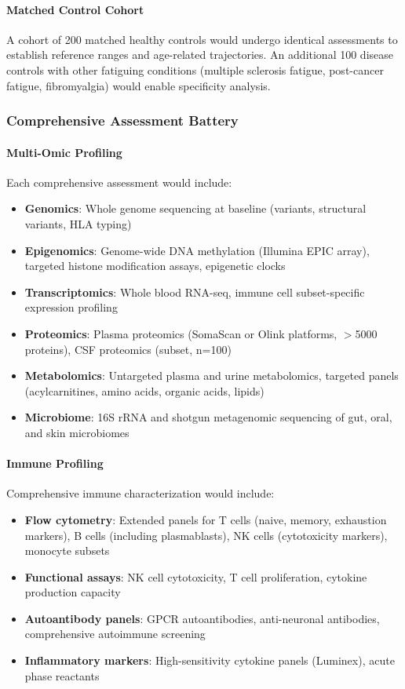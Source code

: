 \paragraph{Matched Control Cohort}
A cohort of 200 matched healthy controls would undergo identical assessments to establish reference ranges and age-related trajectories. An additional 100 disease controls with other fatiguing conditions (multiple sclerosis fatigue, post-cancer fatigue, fibromyalgia) would enable specificity analysis.

\subsubsection{Comprehensive Assessment Battery}

\paragraph{Multi-Omic Profiling}
Each comprehensive assessment would include:
\begin{itemize}
    \item \textbf{Genomics}: Whole genome sequencing at baseline (variants, structural variants, HLA typing)
    \item \textbf{Epigenomics}: Genome-wide DNA methylation (Illumina EPIC array), targeted histone modification assays, epigenetic clocks
    \item \textbf{Transcriptomics}: Whole blood RNA-seq, immune cell subset-specific expression profiling
    \item \textbf{Proteomics}: Plasma proteomics (SomaScan or Olink platforms, $>$5000 proteins), CSF proteomics (subset, n=100)
    \item \textbf{Metabolomics}: Untargeted plasma and urine metabolomics, targeted panels (acylcarnitines, amino acids, organic acids, lipids)
    \item \textbf{Microbiome}: 16S rRNA and shotgun metagenomic sequencing of gut, oral, and skin microbiomes
\end{itemize}

\paragraph{Immune Profiling}
Comprehensive immune characterization would include:
\begin{itemize}
    \item \textbf{Flow cytometry}: Extended panels for T cells (naive, memory, exhaustion markers), B cells (including plasmablasts), NK cells (cytotoxicity markers), monocyte subsets
    \item \textbf{Functional assays}: NK cell cytotoxicity, T cell proliferation, cytokine production capacity
    \item \textbf{Autoantibody panels}: GPCR autoantibodies, anti-neuronal antibodies, comprehensive autoimmune screening
    \item \textbf{Inflammatory markers}: High-sensitivity cytokine panels (Luminex), acute phase reactants
\end{itemize}


